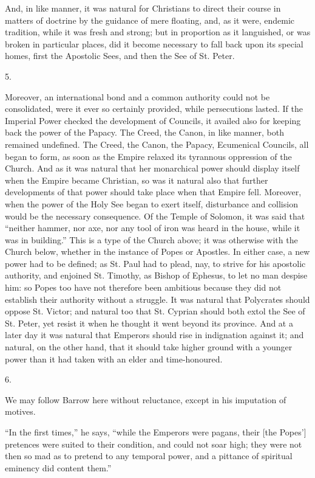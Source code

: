 And, in like manner, it was natural for Christians to
direct their course in matters of doctrine by the
guidance of mere floating, and, as it were, endemic
tradition, while it was fresh and strong; but in
proportion as it languished, or was broken in particular
places, did it become necessary to fall back upon its
special homes, first the Apostolic Sees, and then the See
of St. Peter.

5.

Moreover, an international bond and a common authority
could not be consolidated, were it ever so certainly
provided, while persecutions lasted. If the Imperial
Power checked the development of Councils, it availed
also for keeping back the power of the Papacy. The Creed,
the Canon, in like manner, both remained undefined. The
Creed, the Canon, the Papacy, Ecumenical Councils, all
began to form, as soon as the Empire relaxed its
tyrannous oppression of the Church. And as it was natural
that her monarchical power should display itself when the
Empire became Christian, so was it natural also that
further developments of that power should take place when
that Empire fell. Moreover, when the power of the Holy
See began to exert itself, disturbance and collision
would be the necessary consequence. Of the Temple of
Solomon, it was said that ``neither hammer, nor axe,
nor any tool of iron was heard in the house, while it was
in building.'' This is a type of the Church above; it
was otherwise with the Church below, whether in the
instance of Popes or Apostles. In either case, a new
power had to be defined; as St. Paul had to plead, nay,
to strive for his apostolic authority, and enjoined St.
Timothy, as Bishop of Ephesus, to let no man despise him:
so Popes too have not therefore been ambitious because
they did not establish their authority without a
struggle. It was natural that Polycrates should oppose
St. Victor; and natural too that St. Cyprian should both
extol the See of St. Peter, yet resist it when he thought
it went beyond its province. And at a later day it was
natural that Emperors should rise in indignation against
it; and natural, on the other hand, that it should take
higher ground with a younger power than it had taken with
an elder and time-honoured.

6.

We may follow Barrow here without reluctance, except
in his imputation of motives.

``In the first times,'' he says, ``while
the Emperors were pagans, their [the Popes'] pretences
were suited to their condition, and could not soar high;
they were not then so mad as to pretend to any temporal
power, and a pittance of spiritual eminency did content
them.''

